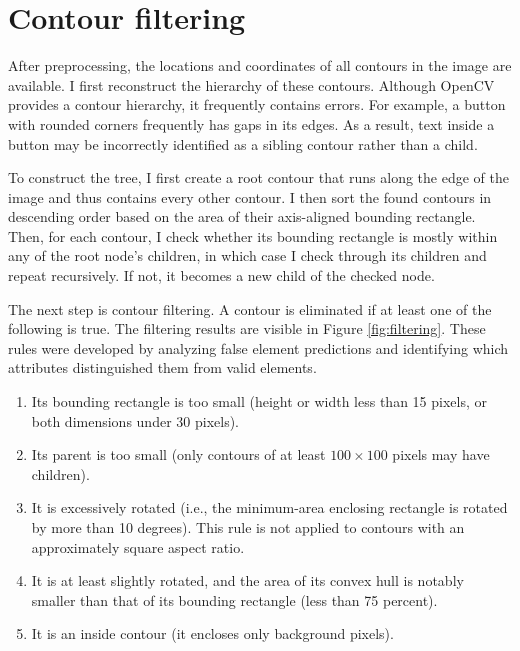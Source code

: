 \documentclass[
  digital,     %
  oneside,     %
  nosansbold,  %
  nocolorbold, %
  lof,         %
  lot,         %
]{fithesis4}
\begin{document}
\section{Contour filtering}

After preprocessing, the locations and coordinates of all contours in the image are available. I first reconstruct the hierarchy of these contours. Although OpenCV provides a contour hierarchy, it frequently contains errors. For example, a button with rounded corners frequently has gaps in its edges. As a result, text inside a button may be incorrectly identified as a sibling contour rather than a child.

To construct the tree, I first create a root contour that runs along the edge of the image and thus contains every other contour. I then sort the found contours in descending order based on the area of their axis-aligned bounding rectangle. Then, for each contour, I check whether its bounding rectangle is mostly within any of the root node's children, in which case I check through its children and repeat recursively. If not, it becomes a new child of the checked node.

The next step is contour filtering. A contour is eliminated if at least one of the following is true. The filtering results are visible in Figure \ref{fig:filtering}. These rules were developed by analyzing false element predictions and identifying which attributes distinguished them from valid elements.

\begin{enumerate}
    \item Its bounding rectangle is too small (height or width less than 15 pixels, or both dimensions under 30 pixels).
    \item Its parent is too small (only contours of at least $100 \times 100$ pixels may have children).
    \item It is excessively rotated (i.e., the minimum-area enclosing rectangle is rotated by more than 10 degrees). This rule is not applied to contours with an approximately square aspect ratio.
    \item It is at least slightly rotated, and the area of its convex hull is notably smaller than that of its bounding rectangle (less than 75 percent).
    \item It is an inside contour (it encloses only background pixels).
\end{enumerate}
\end{document}
